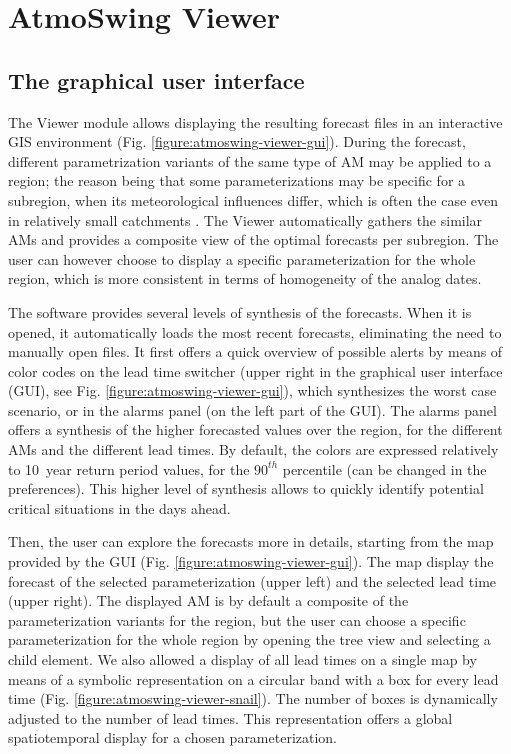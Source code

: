 \documentclass[review]{elsarticle}
\begin{document}
\section{AtmoSwing Viewer}
\label{sec:viewer}

\subsection{The graphical user interface }

The Viewer module allows displaying the resulting forecast files in an interactive GIS environment (Fig. \ref{figure:atmoswing-viewer-gui}). During the forecast, different parametrization variants of the same type of AM may be applied to a region; the reason being that some parameterizations may be specific for a subregion, when its meteorological influences differ, which is often the case even in relatively small catchments \citep{Horton2012}. The Viewer automatically gathers the similar AMs and provides a composite view of the optimal forecasts per subregion. The user can however choose to display a specific parameterization for the whole region, which is more consistent in terms of homogeneity of the analog dates.

The software provides several levels of synthesis of the forecasts. When it is opened, it automatically loads the most recent forecasts, eliminating the need to manually open files. It first offers a quick overview of possible alerts by means of color codes on the lead time switcher (upper right in the graphical user interface (GUI), see Fig. \ref{figure:atmoswing-viewer-gui}), which synthesizes the worst case scenario, or in the alarms panel (on the left part of the GUI). The alarms panel offers a synthesis of the higher forecasted values over the region, for the different AMs and the different lead times. By default, the colors are expressed relatively to 10~year return period values, for the $90^{th}$ percentile (can be changed in the preferences). This higher level of synthesis allows to quickly identify potential critical situations in the days ahead.

Then, the user can explore the forecasts more in details, starting from the map provided by the GUI (Fig. \ref{figure:atmoswing-viewer-gui}). The map display the forecast of the selected parameterization (upper left) and the selected lead time (upper right). The displayed AM is by default a composite of the parameterization variants for the region, but the user can choose a specific parameterization for the whole region by opening the tree view and selecting a child element. We also allowed a display of all lead times on a single map by means of a symbolic representation on a circular band with a box for every lead time (Fig. \ref{figure:atmoswing-viewer-snail}). The number of boxes is dynamically adjusted to the number of lead times. This representation offers a global spatiotemporal display for a chosen parameterization.
\end{document}
